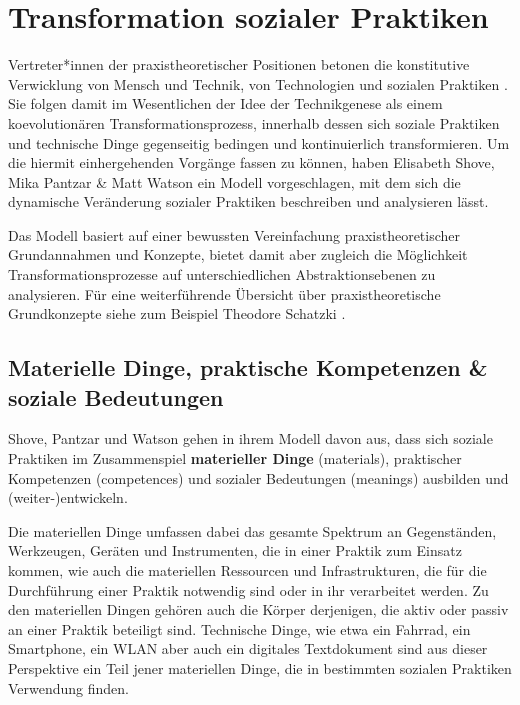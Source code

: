 \documentclass[
  a4paper,
]{book}
\begin{document}
\chapter{Transformation sozialer Praktiken}\label{transformation-sozialer-praktiken}

Vertreter*innen der praxistheoretischer Positionen betonen die konstitutive Verwicklung von Mensch und Technik, von Technologien und sozialen Praktiken \citep{horningExpertenAlltags2001, orlikowskiUsingTechnologyConstituting2000, schatzkiMaterialitySocialLife2010, shoveDynamicsSocialPractice2012}. Sie folgen damit im Wesentlichen der Idee der Technikgenese als einem koevolutionären Transformationsprozess, innerhalb dessen sich soziale Praktiken und technische Dinge gegenseitig bedingen und kontinuierlich transformieren. Um die hiermit einhergehenden Vorgänge fassen zu können, haben Elisabeth Shove, Mika Pantzar \& Matt Watson \citep{shoveDynamicsSocialPractice2012} ein Modell vorgeschlagen, mit dem sich die dynamische Veränderung sozialer Praktiken beschreiben und analysieren lässt.

Das Modell basiert auf einer bewussten Vereinfachung praxistheoretischer Grundannahmen und Konzepte, bietet damit aber zugleich die Möglichkeit Transformationsprozesse auf unterschiedlichen Abstraktionsebenen zu analysieren. Für eine weiterführende Übersicht über praxistheoretische Grundkonzepte siehe zum Beispiel Theodore Schatzki \citep{schatzkiPrimerPracticesTheory2012}.

\section{Materielle Dinge, praktische Kompetenzen \& soziale Bedeutungen}\label{materielle-dinge-praktische-kompetenzen-soziale-bedeutungen}

Shove, Pantzar und Watson \citep{shoveDynamicsSocialPractice2012} gehen in ihrem Modell davon aus, dass sich soziale Praktiken im Zusammenspiel \textbf{materieller Dinge} (materials), praktischer Kompetenzen (competences) und sozialer Bedeutungen (meanings) ausbilden und (weiter-)entwickeln.

Die materiellen Dinge umfassen dabei das gesamte Spektrum an Gegenständen, Werkzeugen, Geräten und Instrumenten, die in einer Praktik zum Einsatz kommen, wie auch die materiellen Ressourcen und Infrastrukturen, die für die Durchführung einer Praktik notwendig sind oder in ihr verarbeitet werden. Zu den materiellen Dingen gehören auch die Körper derjenigen, die aktiv oder passiv an einer Praktik beteiligt sind. Technische Dinge, wie etwa ein Fahrrad, ein Smartphone, ein WLAN aber auch ein digitales Textdokument sind aus dieser Perspektive ein Teil jener materiellen Dinge, die in bestimmten sozialen Praktiken Verwendung finden.
\end{document}
